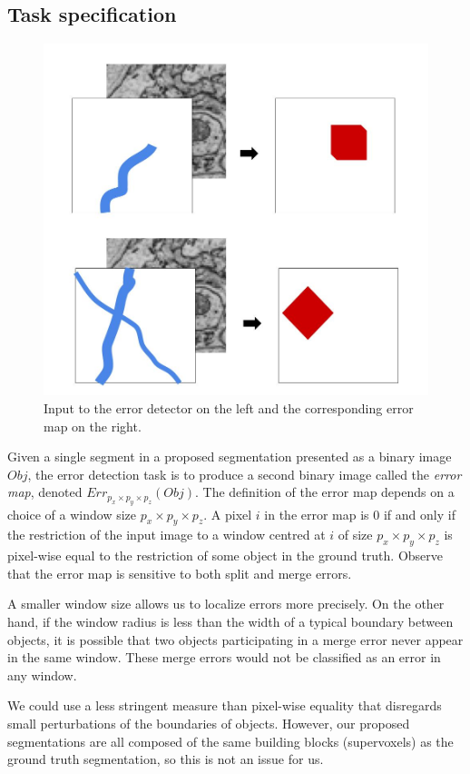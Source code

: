 \documentclass{article}
\begin{document}
\subsection{Task specification}
\label{sec:detection_spec}

\begin{figure}
\begin{center}
	\includegraphics[width=0.65\linewidth]{detection_task.jpg}
	\caption{Input to the error detector on the left and the corresponding error map on the right.}
	\label{fig:error_detection_cartoon}
\end{center}
\end{figure}

Given a single segment in a proposed segmentation presented as a binary image $Obj$, the error detection task is to produce a second binary image called the \textit{error map}, denoted $Err_{p_x\times p_y \times p_z}(Obj)$. The definition of the error map depends on a choice of a window size $p_x \times p_y \times p_z$. A pixel $i$ in the error map is 0 if and only if the restriction of the input image to a window centred at $i$ of size $p_x \times p_y \times p_z$ is pixel-wise equal to the restriction of some object in the ground truth. Observe that the error map is sensitive to both split and merge errors.

A smaller window size allows us to localize errors more precisely. On the other hand, if the window radius is less than the width of a typical boundary between objects, it is possible that two objects participating in a merge error never appear in the same window. These merge errors would not be classified as an error in any window.

We could use a less stringent measure than pixel-wise equality that disregards small perturbations of the boundaries of objects. However, our proposed segmentations are all composed of the same building blocks (supervoxels) as the ground truth segmentation, so this is not an issue for us.
\end{document}
